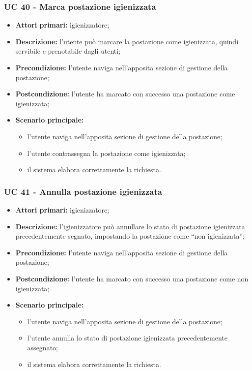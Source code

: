\subsubsection{UC 40 - Marca postazione igienizzata}

\begin{itemize}
\item \textbf{Attori primari:} igienizzatore;
\item \textbf{Descrizione:} l'utente può marcare la postazione come igienizzata, quindi servibile e prenotabile dagli utenti;
\item \textbf{Precondizione:} l'utente naviga nell’apposita sezione di gestione della postazione; 
\item \textbf{Postcondizione:} l’utente ha marcato con successo una postazione come igienizzata;
\item \textbf{Scenario principale:} 
	\begin{itemize}
		\item l'utente naviga nell’apposita sezione di gestione della postazione;		
		\item l’utente contrassegna la postazione come igienizzata;
		\item il sistema elabora correttamente la richiesta.
	\end{itemize}
\end{itemize}

\subsubsection{UC 41 - Annulla postazione igienizzata}

\begin{itemize}
\item \textbf{Attori primari:} igienizzatore;
\item \textbf{Descrizione:} l’igienizzatore può annullare lo stato di postazione igienizzata precedentemente segnato, impostando la postazione come “non igienizzata”;
\item \textbf{Precondizione:} l'utente naviga nell’apposita sezione di gestione della postazione; 
\item \textbf{Postcondizione:} l'utente ha marcato con successo una postazione come non igienizzata;
\item \textbf{Scenario principale:} 
	\begin{itemize}
		\item l’utente naviga nell’apposita sezione di gestione della postazione;		
		\item l’utente annulla lo stato di postazione igienizzata precedentemente assegnato;
		\item il sistema elabora correttamente la richiesta.
		\end{itemize}
\end{itemize}


